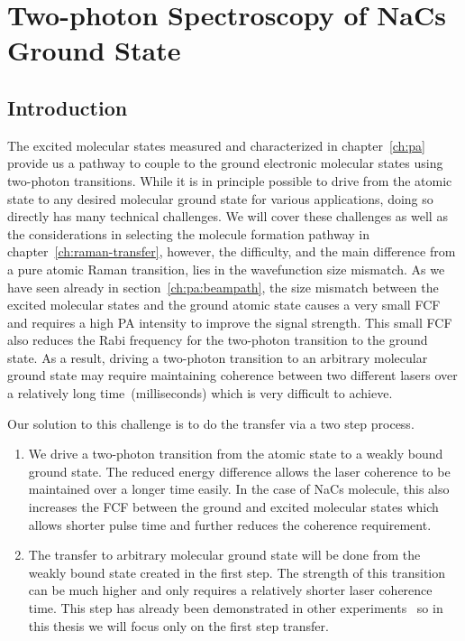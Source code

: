 
\chapter{Two-photon Spectroscopy of NaCs Ground State}
\label{ch:raman-spectroscopy}

\section{Introduction}
\label{ch:raman-spectroscopy:introduction}


The excited molecular states measured and characterized in chapter~\ref{ch:pa}
provide us a pathway to couple to the ground electronic molecular states
using two-photon transitions.
While it is in principle possible to drive from the atomic state
to any desired molecular ground state for various applications,
doing so directly has many technical challenges.
We will cover these challenges as well as the considerations in selecting
the molecule formation pathway in chapter~\ref{ch:raman-transfer},
however, the difficulty, and the main difference from a pure atomic Raman transition,
lies in the wavefunction size mismatch.
As we have seen already in section~\ref{ch:pa:beampath},
the size mismatch between the excited molecular states and the ground atomic state
causes a very small FCF and requires a high PA intensity to improve the signal strength.
This small FCF also reduces the Rabi frequency for the two-photon transition to the ground state.
As a result, driving a two-photon transition to an arbitrary molecular ground state
may require maintaining coherence between two different lasers over
a relatively long time~(milliseconds) which is very difficult to achieve.

Our solution to this challenge is to do the transfer via a two step process.
\begin{enumerate}
\item We drive a two-photon transition from the atomic state to
  a weakly bound ground state.
  The reduced energy difference allows the laser coherence to be maintained
  over a longer time easily.
  In the case of NaCs molecule, this also increases the FCF
  between the ground and excited molecular states which allows shorter pulse time and
  further reduces the coherence requirement.
\item The transfer to arbitrary molecular ground state will be done from
  the weakly bound state created in the first step.
  The strength of this transition can be much higher
  and only requires a relatively shorter laser coherence time.
  This step has already been demonstrated in other experiments~\cite{ni_high_2008}
  so in this thesis we will focus only on the first step transfer.
\end{enumerate}


